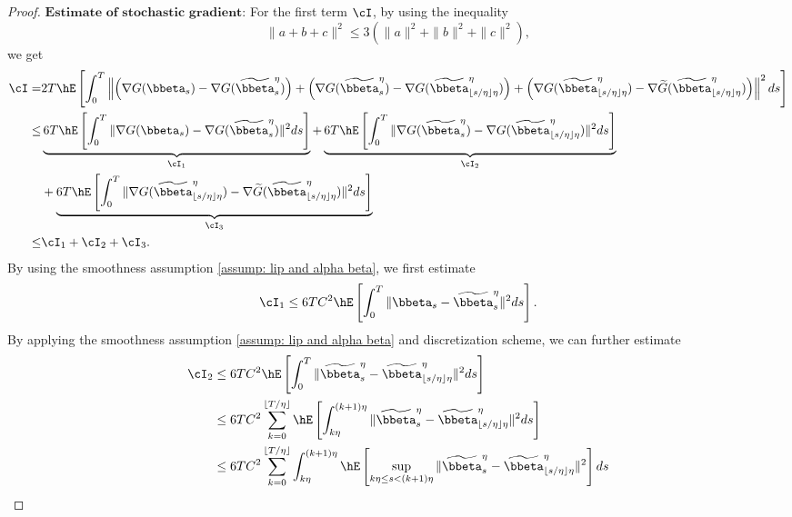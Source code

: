 \begin{proof}
\noindent
$\textbf{Estimate of stochastic gradient:}$
For the first term $\cI$, by using the inequality
$$\|a+b+c\|^2\le 3(\|a\|^2+\|b\|^2+\|c\|^2),$$ 
we get  
\begin{equation}
	\begin{split}
		\cI=&2T\hE\left[\int_0^T\left\|\left(\nabla G(\bbeta_s)-\nabla G(\widetilde \bbeta^{\eta}_s)\right)+\left(\nabla G(\widetilde \bbeta^{\eta}_s)-\nabla  G(\widetilde \bbeta^{\eta}_{\lfloor s/\eta \rfloor\eta})\right)+\left(\nabla  G(\widetilde \bbeta^{\eta}_{\lfloor s/\eta \rfloor\eta})-\nabla \widetilde G(\widetilde \bbeta^{\eta}_{\lfloor s/\eta \rfloor\eta})\right)\right\|^2ds \right]\\
		\le& \underbrace{6T\hE\left[\int_0^T\|\nabla G(\bbeta_s)-\nabla  G(\widetilde \bbeta^{\eta}_s)\|^2ds\right]}_{\cI_1}+\underbrace{6T\hE\left[\int_0^T\|\nabla  G(\widetilde \bbeta^{\eta}_s)-\nabla  G(\widetilde \bbeta^{\eta}_{\lfloor s/\eta \rfloor\eta})\|^2ds\right]}_{\cI_2}\\
		&+\underbrace{6T\hE\left[\int_0^T\|\nabla  G(\widetilde \bbeta^{\eta}_{\lfloor s/\eta \rfloor\eta})-\nabla \widetilde G(\widetilde \bbeta^{\eta}_{\lfloor s/\eta \rfloor\eta})\|^2ds\right]}_{\cI_3}\\
		\le& \cI_1+\cI_2+\cI_3.
	\end{split}
\end{equation}
By using the smoothness assumption \ref{assump: lip and alpha beta}, we first estimate 
\begin{equation*}
    \cI_1 \le 6TC^2\hE\left[\int_0^T\|\bbeta_s-\widetilde \bbeta^{\eta}_s\|^2ds\right].
\end{equation*}{}
By applying the smoothness assumption \ref{assump: lip and alpha beta} and discretization scheme, we can further estimate 
\begin{equation}\label{est cI2}
    \begin{split}
        \cI_2&\le 6TC^2\hE\left[\int_0^T\|\widetilde \bbeta^{\eta}_s-\widetilde \bbeta^{\eta}_{\lfloor s/\eta \rfloor\eta}\|^2ds\right]\\
        &\le 6TC^2\sum_{k=0}^{\lfloor T/\eta\rfloor} \hE\left[\int_{k\eta}^{(k+1)\eta}\|\widetilde \bbeta^{\eta}_s-\widetilde \bbeta^{\eta}_{\lfloor s/\eta \rfloor\eta} \|^2ds \right]\\
        &\le 6TC^2\sum_{k=0}^{\lfloor T/\eta\rfloor} \int_{k\eta}^{(k+1)\eta}\hE\left[\sup_{k\eta\le s<(k+1)\eta}\|\widetilde \bbeta^{\eta}_s-\widetilde \bbeta^{\eta}_{\lfloor s/\eta \rfloor\eta} \|^2\right]ds 
    \end{split}{}

\end{equation}
\end{proof}
